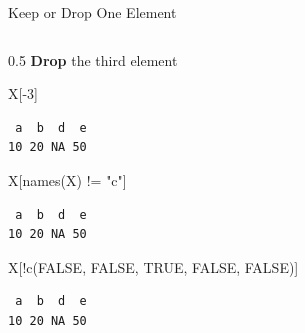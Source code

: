 \documentclass[
  ignorenonframetext,
  aspectratio=169,
]{beamer}
\newenvironment{Shaded}{\begin{snugshade}}{\end{snugshade}}
\newcommand{\ConstantTok}[1]{\textcolor[rgb]{0.56,0.35,0.01}{#1}}
\newcommand{\DecValTok}[1]{\textcolor[rgb]{0.68,0.00,0.00}{#1}}
\newcommand{\FunctionTok}[1]{\textcolor[rgb]{0.28,0.35,0.67}{#1}}
\newcommand{\NormalTok}[1]{\textcolor[rgb]{0.00,0.23,0.31}{#1}}
\newcommand{\SpecialCharTok}[1]{\textcolor[rgb]{0.37,0.37,0.37}{#1}}
\newcommand{\StringTok}[1]{\textcolor[rgb]{0.13,0.47,0.30}{#1}}
\begin{document}
\begin{frame}[fragile]{Keep or Drop One Element}
\begin{columns}[T]
\begin{column}{0.5\textwidth}
\textbf{Drop} the third element

\begin{Shaded}
\begin{Highlighting}[]
\NormalTok{X[}\SpecialCharTok{{-}}\DecValTok{3}\NormalTok{]}
\end{Highlighting}
\end{Shaded}

\begin{verbatim}
 a  b  d  e 
10 20 NA 50 
\end{verbatim}

\begin{Shaded}
\begin{Highlighting}[]
\NormalTok{X[}\FunctionTok{names}\NormalTok{(X) }\SpecialCharTok{!=} \StringTok{"c"}\NormalTok{]}
\end{Highlighting}
\end{Shaded}

\begin{verbatim}
 a  b  d  e 
10 20 NA 50 
\end{verbatim}

\begin{Shaded}
\begin{Highlighting}[]
\NormalTok{X[}\SpecialCharTok{!}\FunctionTok{c}\NormalTok{(}\ConstantTok{FALSE}\NormalTok{, }\ConstantTok{FALSE}\NormalTok{, }\ConstantTok{TRUE}\NormalTok{, }\ConstantTok{FALSE}\NormalTok{, }\ConstantTok{FALSE}\NormalTok{)]}
\end{Highlighting}
\end{Shaded}

\begin{verbatim}
 a  b  d  e 
10 20 NA 50 
\end{verbatim}
\end{column}
\end{columns}
\end{frame}
\end{document}
